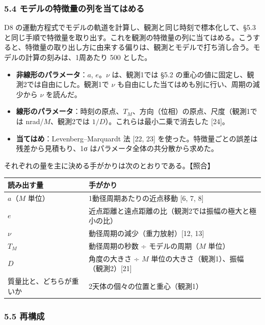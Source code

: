 \documentclass[
  a4paper,
]{ltjsarticle}
\newcounter{none} %
\providecommand{\tightlist}{%
  \setlength{\itemsep}{0pt}\setlength{\parskip}{0pt}}
\begin{document}
\subsubsection{5.4
モデルの特徴量の列を当てはめる}\label{ux30e2ux30c7ux30ebux306eux7279ux5fb4ux91cfux306eux5217ux3092ux5f53ux3066ux306fux3081ux308b}

D8 の運動方程式でモデルの軌道を計算し、観測と同じ時刻で標本化して、§5.3
と同じ手順で特徴量を取り出す。これを観測の特徴量の列に当てはめる。こうすると、特徴量の取り出し方に由来する偏りは、観測とモデルで打ち消し合う。モデルの計算の刻みは、1周あたり
500 とした。

\begin{itemize}
\tightlist
\item
  \textbf{非線形のパラメータ}：\(a\), \(e\)。\(\nu\) は、観測1では §5.2
  の重心の値に固定し、観測2では自由にした。観測1で \(\nu\)
  も自由にした当てはめも別に行い、周期の減少から \(\nu\) を読んだ。
\item
  \textbf{線形のパラメータ}：時刻の原点、\(T_M\)、方向（位相）の原点、尺度（観測1では
  nrad/\(M\)、観測2では \(1/D\)）。これらは最小二乗で消去した {[}24{]}。
\item
  \textbf{当てはめ}：Levenberg--Marquardt 法 {[}22, 23{]}
  を使った。特徴量ごとの誤差は残差から見積もり、1σ
  はパラメータ全体の共分散から求めた。
\end{itemize}

それぞれの量を主に決める手がかりは次のとおりである。【照合】

{\def\LTcaptype{none} %
\begin{longtable}[]{@{}ll@{}}
\toprule\noalign{}
読み出す量 & 手がかり \\
\midrule\noalign{}
\endhead
\bottomrule\noalign{}
\endlastfoot
\(a\)（\(M\) 単位） & 1動径周期あたりの近点移動 {[}6, 7, 8{]} \\
\(e\) & 近点距離と遠点距離の比（観測2では振幅の極大と極小の比） \\
\(\nu\) & 動径周期の減少（重力放射）{[}12, 13{]} \\
\(T_M\) & 動径周期の秒数 ÷ モデルの周期（\(M\) 単位） \\
\(D\) & 角度の大きさ ÷ \(M\)
単位の大きさ（観測1）、振幅（観測2）{[}21{]} \\
質量比と、どちらが重いか & 2天体の個々の位置と重心（観測1） \\
\end{longtable}
}

\subsubsection{5.5 再構成}\label{ux518dux69cbux6210}
\end{document}
